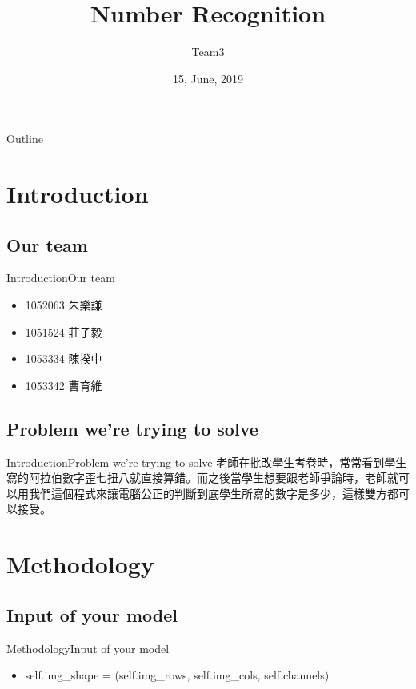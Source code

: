 \documentclass{beamer}
\title{Number Recognition}
\author{Team3}
\date{15, June, 2019}
\begin{document}
\begin{CJK*}{UTF8}{bsmi}
\begin{frame}
  \titlepage
\end{frame}

\begin{frame}{Outline}
  \tableofcontents
\end{frame}

\section{Introduction}
\subsection*{Our team}
\begin{frame}{Introduction}{Our team}
  \begin{itemize}
  \item {
    1052063 朱樂謙    
  }
  \item {
    1051524 莊子毅
  }
  \item {
    1053334 陳揆中
  }
  \item {
    1053342 曹育維
  }
  \end{itemize}
\end{frame}
\subsection*{Problem we're trying to solve}
\begin{frame}{Introduction}{Problem we're trying to solve}
老師在批改學生考卷時，常常看到學生寫的阿拉伯數字歪七扭八就直接算錯。而之後當學生想要跟老師爭論時，老師就可以用我們這個程式來讓電腦公正的判斷到底學生所寫的數字是多少，這樣雙方都可以接受。
\end{frame}

\section{Methodology}
\subsection*{Input of your model}
\begin{frame}{Methodology}{Input of your model}
  \begin{itemize}
  \item {
self.img\_shape = (self.img\_rows, self.img\_cols, self.channels)
  }
  \end{itemize}
\end{frame}

\end{CJK*}
\end{document}
